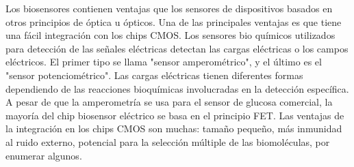 \documentclass[10pt,a4paper]{article}
\begin{document}
\begin{multicols}{2}
Los biosensores contienen ventajas que los sensores de dispositivos basados en otros principios de óptica u ópticos. Una de las principales ventajas es que tiene una fácil integración con los chips CMOS. Los sensores bio químicos utilizados para detección de las señales eléctricas detectan las cargas eléctricas o los campos eléctricos. El primer tipo se llama "sensor amperométrico", y el último es el "sensor potenciométrico". Las cargas eléctricas tienen diferentes formas dependiendo de las reacciones bioquímicas involucradas en la detección específica. A pesar de que la amperometría se usa para el sensor de glucosa comercial, la mayoría del chip biosensor eléctrico se basa en el principio FET. Las ventajas de la integración en los chips CMOS son muchas: tamaño pequeño, más inmunidad al ruido externo, potencial para la selección múltiple de las biomoléculas, por enumerar algunos.
\\
\end{multicols} %
\end{document}
